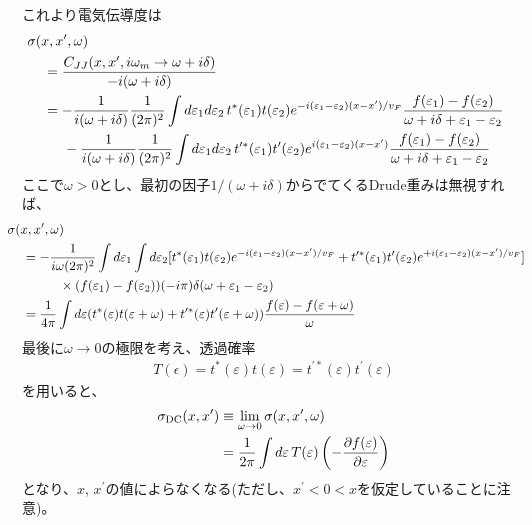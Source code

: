 \documentclass[10pt,a4j]{jarticle}
\begin{document}
これより電気伝導度は
\begin{align}
& \hspace{-4mm} \sigma(x,x^\prime,\omega) \nonumber \\
&= \frac{C_{JJ}(x,x^\prime,i\omega_m\rightarrow \omega + i \delta)}{-i(\omega+i\delta)} \nonumber \\
&= - \frac{1}{i(\omega+i\delta)}
\frac{1}{(2\pi)^2} \int d\varepsilon_1 d\varepsilon_2 \, t^{*}(\varepsilon_1)t(\varepsilon_2) 
e^{-i(\varepsilon_1-\varepsilon_2)(x-x^\prime)/v_F} 
\frac{f(\varepsilon_1) - f(\varepsilon_2)}{\omega + i \delta + \varepsilon_1-\varepsilon_2 } \nonumber \\
&\hspace{5mm} -  \frac{1}{i(\omega+i\delta)} \frac{1}{(2\pi)^2} 
\int d\varepsilon_1 d\varepsilon_2 \,  t^{\prime*}(\varepsilon_1)t^\prime(\varepsilon_2) e^{i(\varepsilon_1-\varepsilon_2)(x-x^\prime)} 
\frac{f(\varepsilon_1) - f(\varepsilon_2)}{\omega + i \delta + \varepsilon_1-\varepsilon_2 } 
\end{align}
ここで$\omega > 0$とし、最初の因子$1/(\omega + i\delta)$からでてくるDrude重みは無視すれば、
\begin{align}
& \hspace{-4mm} \sigma(x,x^\prime,\omega) \nonumber \\
&= - \frac{1}{i\omega(2\pi)^2} \int d\varepsilon_1 \int d\varepsilon_2
[ t^*(\varepsilon_1)t(\varepsilon_2) e^{-i(\varepsilon_1-\varepsilon_2)(x-x^\prime)/v_F} 
+  t^{\prime*}(\varepsilon_1)t^\prime(\varepsilon_2) e^{+i(\varepsilon_1-\varepsilon_2)(x-x^\prime)/v_F}] \nonumber \\
& \hspace{10mm} \times 
( f(\varepsilon_1) - f(\varepsilon_2)) (-i\pi) \delta(\omega + \varepsilon_1-\varepsilon_2 ) \\
&=  \frac{1}{4 \pi} \int d\varepsilon (t^*(\varepsilon)t(\varepsilon+\omega) + t^{\prime*}(\varepsilon)t^\prime(\varepsilon+\omega) )
\frac{f(\varepsilon) - f(\varepsilon+\omega)}{\omega}
\end{align}
最後に$\omega \rightarrow 0$の極限を考え、透過確率
\begin{align}
T(\epsilon) = t^*(\varepsilon)t(\varepsilon)  = t^{\prime*}(\varepsilon)t^\prime(\varepsilon) 
\end{align}
を用いると、
\begin{align}
\sigma_{{\rm DC}}(x,x^\prime) &\equiv \lim_{\omega \rightarrow 0} \sigma(x,x^\prime,\omega) \nonumber \\
&=  \frac{1}{2\pi } \int d\varepsilon \, T(\varepsilon) \left( - \frac{\partial f(\varepsilon)}{\partial \varepsilon}\right) 
\end{align}
となり、$x$, $x^\prime$の値によらなくなる(ただし、$x^\prime < 0 < x$を仮定していることに注意)。
\end{document}
